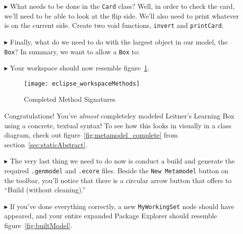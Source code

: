 \begin{itemize}
\item[$\blacktriangleright$] What needs to be done in the \texttt{Card} class? Well, in order to check the card, we'll need to be able to look at the flip side. We'll also need to print whatever is on the current side. Create two void functions, \texttt{invert} and \texttt{printCard}.

\pagebreak

\item[$\blacktriangleright$] Finally, what do we need to do with the largest object in our model, the \texttt{Box}? In summary, we want to allow a \texttt{Box} to:



\item[$\blacktriangleright$] Your workspace should now resemble figure~\ref{fig:workspaceMethods}.
\begin{figure}[htbp]
	\centering
  \texttt{[image: eclipse\_workspaceMethods]}
	\caption{Completed Method Signatures}
	\label{fig:workspaceMethods}
\end{figure}


Congratulations! You've \emph{almost} completeley modeled Leitner's Learning Box using a concrete, textual syntax! To see how this looks in visually in a class diagram, check out figure~\ref{fig:metamodel_complete} from section~\ref{sec:staticAbstract}.

\item[$\blacktriangleright$]The very last thing we need to do now is conduct a build and generate the required \texttt{.genmodel} and \texttt{.ecore} files. Beside the \texttt{New Metamodel} button on the toolbar, you'll notice that there is a circular arrow button that offers to ``Build (without cleaning).'' %

\item[$\blacktriangleright$] If you've done everything correctly, a new \texttt{MyWorkingSet} node should have appeared, and your entire expanded Package Explorer should resemble figure~\ref{fig:builtModel}.


\end{itemize}
